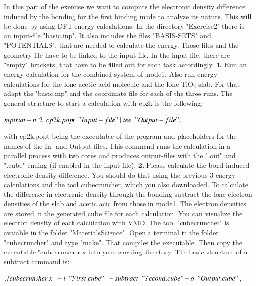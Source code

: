 \documentclass[]{article}
\begin{document}
In this part of the exercise we want to compute the electronic density difference induced by the bonding for the first binding mode to analyze its nature. This will be done by using DFT energy calculations. In the directory "Exercise2" there is an input-file "basic.inp". It also includes the files "BASIS-SETS" and "POTENTIALS", that are needed to calculate the energy. Those files and the geometry file have to be linked to the input file. In the input file, there are "empty" brackets, that have to be filled out for each task accordingly.  
\newline
\newline
\textbf{1.} Run an energy calculation for the combined system of mode1. Also run energy calculations for the lone acetic acid molecule and the lone TiO$_{2}$ slab. For that adapt the "basic.inp" and the coordinate file for each of the three runs. 
\newline
\newline
The general structure to start a calculation with cp2k is the following:
\begin{center}
$mpirun -n \ \ 2 \ \ cp2k.popt\ \ "Input-file" \ |\ tee \ \ "Output-file" ,$
\end{center} 
with cp2k.popt being the executable of the program and placeholders for the names of the In- and Output-files. This command runs the calculation in a parallel process with two cores and produces output-files with the ".out" and ".cube" ending (if enabled in the input-file). 
\newline
\newline
\textbf{2.} Please calculate the bond induced electronic density difference. You should do that using the previous 3 energy calculations and the tool cubecruncher, which you also downloaded. To calculate the difference in electronic density through the bonding subtract the lone electron densities of the slab and acetic acid from those in mode1. The electron densities are stored in the generated cube file for each calculation. You can visualize the electron density of each calculation with VMD.
\newline
\newline
The tool "cubecruncher" is avaiable in the folder "MaterialsScience". Open a terminal in the folder "cubecruncher" and type "make". That compiles the executable. Then copy the executable "cubecruncher.x into your working directory. The basic structure of a subtract command is:
\begin{center}
$./cubecrunsher.x \ \ -i \ \ "First.cube" \ \ -subtract\ \ "Second.cube" -o \ \ "Output.cube"$,
\end{center}
\end{document}
